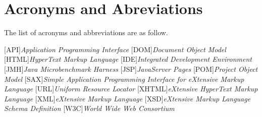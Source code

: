 \chapter*{Acronyms and Abreviations} \label{chap:acronyms}

The list of acronyms and abbreviations are as follow. \\

\begin{acronym}[Z] 

[API]{\emph{Application Programming Interface}}
[DOM]{\emph{Document Object Model}}
[HTML]{\emph{HyperText Markup Language}}
[IDE]{\emph{Integrated Development Environment}}
[JMH]{\emph{Java Microbenchmark Harness}}
[JSP]{\emph{JavaServer Pages}}
[POM]{\emph{Project Object Model}}
[SAX]{\emph{Simple Application Programming Interface for eXtensive Markup Language}}
[URL]{\emph{Uniform Resource Locator}}
[XHTML]{\emph{eXtensive HyperText Markup Language}}
[XML]{\emph{eXtensive Markup Language}}
[XSD]{\emph{eXtensive Markup Language Schema Definition}}
[W3C]{\emph{World Wide Web Consortium}}

\end{acronym}


